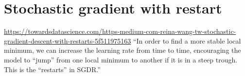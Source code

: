 \documentclass{article}
\begin{document}
\section{Stochastic gradient with restart}
\url{https://towardsdatascience.com/https-medium-com-reina-wang-tw-stochastic-gradient-descent-with-restarts-5f511975163}
``In order to find a more stable local minimum, we can increase the learning rate from time to time, encouraging the model to “jump” from one local minimum to another if it is in a steep trough. This is the “restarts” in SGDR.''
\end{document}
